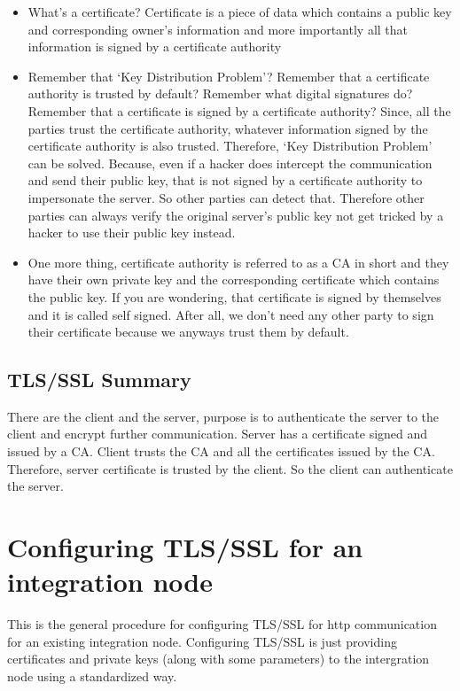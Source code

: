 \documentclass{article}
\begin{document}
\begin{itemize}
        \item What's a certificate? Certificate is a piece of data which contains a public key and corresponding owner's information and more importantly all that information is signed by a certificate authority
        \item Remember that `Key Distribution Problem'? Remember that a certificate authority is trusted by default? Remember what digital signatures do? Remember that a certificate is signed by a certificate authority? Since, all the parties trust the certificate authority, whatever information signed by the certificate authority is also trusted. Therefore, `Key Distribution Problem' can be solved. Because, even if a hacker does intercept the communication and send their public key, that is not signed by a certificate authority to impersonate the server. So other parties can detect that. Therefore other parties can always verify the original server's public key not get tricked by a hacker to use their public key instead.
        \item One more thing, certificate authority is referred to as a CA in short and they have their own private key and the corresponding certificate which contains the public key. If you are wondering, that certificate is signed by themselves and it is called self signed. After all, we don't need any other party to sign their certificate because we anyways trust them by default.
    \end{itemize}

    \subsection{TLS/SSL Summary}
    There are the client and the server, purpose is to authenticate the server to the client and encrypt further communication. Server has a certificate signed and issued by a CA. Client trusts the CA and all the certificates issued by the CA. Therefore, server certificate is trusted by the client. So the client can authenticate the server. 
    
    \section{Configuring TLS/SSL for an integration node}
    This is the general procedure for configuring TLS/SSL for http communication for an existing integration node. Configuring TLS/SSL is just providing certificates and private keys (along with some parameters) to the intergration node using a standardized way.
\end{document}
